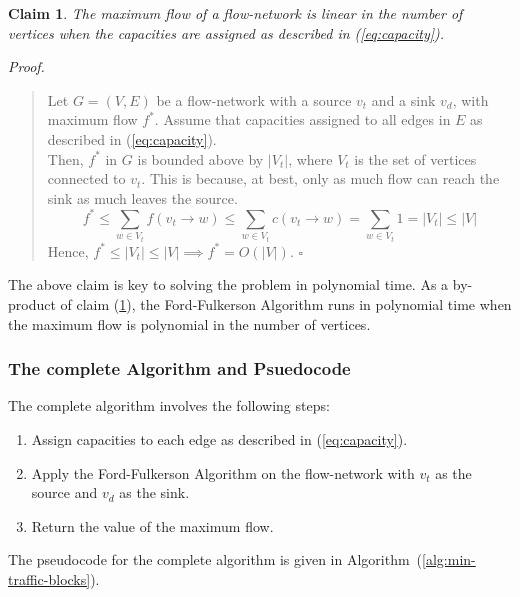 \documentclass[12pt]{report}
\newtheorem{claim}{Claim}
\begin{document}
    \begin{claim}
        \label{claim:polynomial}
        The maximum flow of a flow-network is linear in the number of vertices when
        the capacities are assigned as described in (\ref{eq:capacity}).
    \end{claim}
    \textit{Proof.}
    \begin{quote}
        Let $G = (V, E)$ be a flow-network with a source $v_{t}$ and a sink $v_{d}$, with maximum flow $f^{*}$.
        Assume that capacities assigned to all edges in $E$ as described in (\ref{eq:capacity}).
        \vspace*{10pt} \\
        Then, $f^{*}$ in $G$ is bounded above by $|V_{t}|$, where $V_{t}$ is the set of vertices connected to $v_{t}$.
        This is because, at best, only as much flow can reach the sink as much leaves the source.
        \begin{equation}
            f^{*} \leq \sum_{w \in V_{t}} f(v_{t} \to w) \leq \sum_{w \in V_{t}} c(v_{t} \to w) = \sum_{w \in V_{t}} 1 = |V_{t}| \leq |V|
        \end{equation}
        Hence, $f^{*} \leq |V_{t}| \leq |V| \implies f^{*} = O(|V|)$. \hfill $\square$
    \end{quote}
    \vfill
    The above claim is key to solving the problem in polynomial time.
    As a by-product of claim (\ref{claim:polynomial}), the Ford-Fulkerson Algorithm runs in polynomial time when the maximum flow is polynomial in the number of vertices.

    \subsubsection*{The complete Algorithm and Psuedocode}
    The complete algorithm involves the following steps:
    \begin{enumerate}
        \item Assign capacities to each edge as described in (\ref{eq:capacity}).
        \item Apply the Ford-Fulkerson Algorithm on the flow-network with $v_{t}$ as the source and $v_{d}$ as the sink.
        \item Return the value of the maximum flow.
    \end{enumerate}
    The pseudocode for the complete algorithm is given in Algorithm~(\ref{alg:min-traffic-blocks}).
\end{document}
